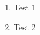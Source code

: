 \documentclass[12pt,twoside,a4paper]{report}
\begin{document}
	\begin{enumerate}
		\item Test 1
		\item Test 2
	\end{enumerate}
\end{document}

